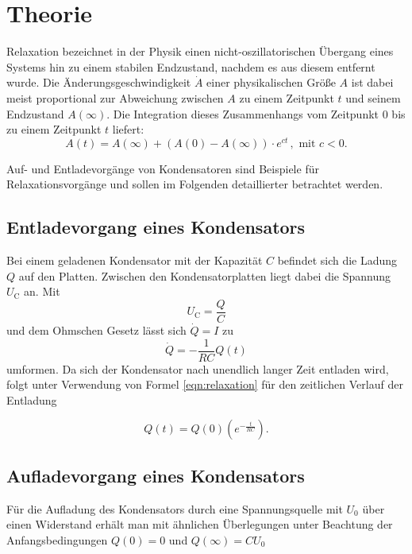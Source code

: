 \section{Theorie}
\label{sec:Theorie}
Relaxation bezeichnet in der Physik einen nicht-oszillatorischen Übergang eines Systems hin zu einem stabilen Endzustand, nachdem es aus diesem entfernt wurde.
Die Änderungsgeschwindigkeit $\dot{A}$ einer physikalischen Größe $A$ ist dabei meist proportional zur Abweichung zwischen $A$ zu einem Zeitpunkt $t$ und seinem Endzustand $A(\infty)$.
Die Integration dieses Zusammenhangs vom Zeitpunkt $0$ bis zu einem Zeitpunkt $t$ liefert:
\begin{equation}
	\label{eqn:relaxation}
	A(t)=A(\infty) + ( A(0)-A(\infty) ) \cdot e^{ct}\, ,\,\, \text{mit}\,\, c<0 .
\end{equation}

Auf- und Entladevorgänge von Kondensatoren sind Beispiele für Relaxationsvorgänge und sollen im Folgenden detaillierter betrachtet werden.
\subsection{Entladevorgang eines Kondensators}
Bei einem geladenen Kondensator mit der Kapazität $C$ befindet sich die Ladung $Q$ auf den Platten.
Zwischen den Kondensatorplatten liegt dabei die Spannung $U_\text{C}$ an. Mit
\begin{equation*}
	U_\text{C}=\frac{Q}{C}
\end{equation*}
und dem Ohmschen Gesetz lässt sich $\dot{Q}=I$ zu
\begin{equation}
	\dot{Q}=-\frac{1}{RC}Q(t)
\end{equation}
umformen.
Da sich der Kondensator nach unendlich langer Zeit entladen wird, folgt unter Verwendung von Formel \eqref{eqn:relaxation} für den zeitlichen Verlauf der Entladung

\begin{equation}
	\label{eqn:aufladung}
	Q(t)=Q(0)(e^{-\frac{t}{RC}}) \text{.}
\end{equation}
\subsection{Aufladevorgang eines Kondensators}
Für die Aufladung des Kondensators durch eine Spannungsquelle mit $U_0$ über einen Widerstand erhält man mit ähnlichen Überlegungen unter Beachtung der Anfangsbedingungen $Q(0)=0$ und $Q(\infty)=CU_\text{0}$

